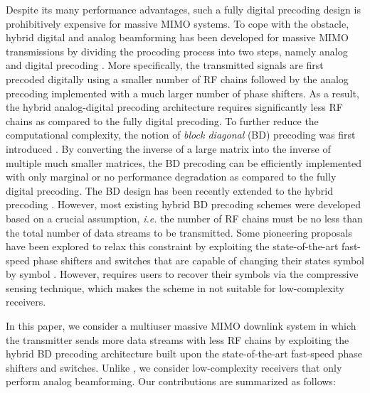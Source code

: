 \documentclass[conference]{IEEEtran}
\begin{document}
Despite its many performance advantages, such a fully digital precoding design is prohibitively expensive for massive MIMO systems. To cope with the obstacle, hybrid digital and analog beamforming has been developed for massive MIMO transmissions by dividing the procoding process into two steps, namely analog and digital precoding \cite{el2014spatially}. More specifically, the transmitted signals are first precoded digitally using a smaller number of RF chains followed by the analog precoding implemented with a much larger number of phase shifters. As a result, the hybrid analog-digital precoding architecture requires significantly less RF chains as compared to the fully digital precoding. To further reduce the computational complexity, the notion of \textit{block diagonal} (BD) precoding was first introduced \cite{spencer2004zero}. By converting the inverse of a large matrix into the inverse of  multiple much smaller matrices, the BD precoding can be efficiently implemented with only marginal or no performance degradation as compared to the fully digital precoding\cite{spencer2004zero}. The BD design has been recently extended to the hybrid precoding \cite{liu2014phase}. However, most existing hybrid BD precoding schemes were developed based on a crucial assumption, {\em i.e.} the number of RF chains must be no less than the total number of data streams to be transmitted. Some pioneering proposals have been explored to relax this constraint by exploiting the state-of-the-art fast-speed phase shifters and switches that are capable of changing their states symbol by symbol \cite{garcia2017mimo}. However, \cite{garcia2017mimo} requires users to recover their symbols via the compressive sensing technique, which makes the scheme in \cite{garcia2017mimo} not suitable for low-complexity receivers.

In this paper, we consider a multiuser massive MIMO downlink system in which the transmitter sends more data streams with less RF chains by exploiting the hybrid BD precoding architecture built upon the state-of-the-art fast-speed phase shifters and switches. Unlike \cite{garcia2017mimo}, we consider low-complexity receivers that only perform analog beamforming. Our contributions are summarized as follows:
\end{document}
